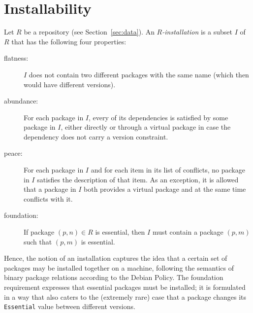 
\section{Installability}
\label{sec:installability}

Let $R$ be a repository (see Section~\ref{sec:data}).  An
\emph{$R$-installation} is a subset $I$ of $R$ that has the following four
properties:
\begin{description}
  \item[flatness:] $I$ does not contain two different packages with the same
    name (which then would have different versions).
  \item[abundance:] For each package in $I$, every of its dependencies
    is satisfied by some package in $I$, either directly or through a
    virtual package in case the dependency does not carry a version
    constraint.
  \item[peace:] For each package in $I$ and for each item in its list
    of conflicts, no package in $I$ satisfies the description of that
    item.  As an exception, it is allowed that a package in $I$ both
    provides a virtual package and at the same time conflicts with it.
  \item[foundation:] If package $(p,n)\in R$ is essential, then $I$
    must contain a package $(p,m)$ such that $(p,m)$ is essential.
\end{description}
Hence, the notion of an installation captures the idea that a certain
set of packages may be installed together on a machine, following the
semantics of binary package relations according to the Debian Policy.
The foundation requirement expresses that essential packages must be
installed; it is formulated in a way that also caters to the
(extremely rare) case that a package changes its \texttt{Essential}
value between different versions.

